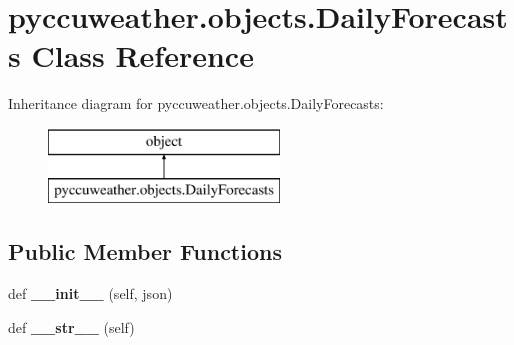 \hypertarget{classpyccuweather_1_1objects_1_1_daily_forecasts}{}\section{pyccuweather.\+objects.\+Daily\+Forecasts Class Reference}
\label{classpyccuweather_1_1objects_1_1_daily_forecasts}
Inheritance diagram for pyccuweather.\+objects.\+Daily\+Forecasts\+:\begin{figure}[H]
\begin{center}
\leavevmode
\includegraphics[height=2.000000cm]{classpyccuweather_1_1objects_1_1_daily_forecasts}
\end{center}
\end{figure}
\subsection*{Public Member Functions}
\begin{DoxyCompactItemize}
\item 
\hypertarget{classpyccuweather_1_1objects_1_1_daily_forecasts_a4ef14a31545197af17e376f261cf4ead}{}def {\bfseries \+\_\+\+\_\+init\+\_\+\+\_\+} (self, json)\label{classpyccuweather_1_1objects_1_1_daily_forecasts_a4ef14a31545197af17e376f261cf4ead}

\item 
\hypertarget{classpyccuweather_1_1objects_1_1_daily_forecasts_a58eead0280f9a9df67401de788adf7e2}{}def {\bfseries \+\_\+\+\_\+str\+\_\+\+\_\+} (self)\label{classpyccuweather_1_1objects_1_1_daily_forecasts_a58eead0280f9a9df67401de788adf7e2}

\end{DoxyCompactItemize}
